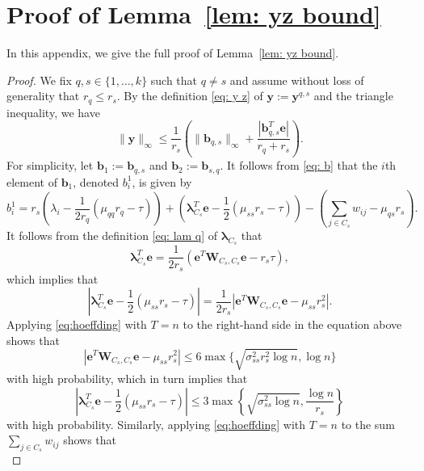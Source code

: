 \documentclass[twoside,11pt]{article}
\renewcommand{\b}{{\bs{b}}}
\newcommand{\e}{\bs {e}}
\newcommand{\bs}{\boldsymbol}
\newcommand{\W}{\bs {W}}
\newcommand{\0}{\bs{0}}
\newcommand{\bra}[1]{\ensuremath{\left\{ #1 \right\}}} %
\begin{document}
{\section{Proof of Lemma~\ref{lem: yz bound}}
\label{app: yz}
In this appendix, we give the full proof of Lemma~\ref{lem: yz bound}.
\begin{proof}
We fix $q,s \in \{1,\dots,k\}$ such that $q \neq s$ and assume without loss of generality that $r_q \leq r_s$.
By the definition \eqref{eq: y z} of $\bs{y} := \bs{y}^{q,s}$ and the triangle inequality, we have
\begin{equation}
\label{eq:y_inf}
	\|\bs{y}\|_{\infty} \leq \frac{1}{r_s}\left( \|\bs{b}_{q,s}\|_{\infty} + \frac{|\bs{b}_{q,s}^T \bs{e}|}{r_q +r_s}\right).
\end{equation}
For simplicity, let \(\b_1:= \b_{q,s}\) and \(\b_2 := \b_{s,q}\).
It follows from \eqref{eq: b} that the $i$th element of $\bs{b}_1$, denoted $b_i^1$, is given by
$$
	b_i^1 = r_s \left( \lambda_i -\frac{1}{2r_q}(\mu_{qq} r_q - \tau) \right) + \left(\bs{\lambda}_{C_s}^T\bs{e} - \frac{1}{2}(\mu_{ss} r_s - \tau) \right) - \left( \sum_{j \in C_s} w_{ij} - \mu_{qs} r_s \right).
$$
It follows from the definition \eqref{eq: lam q} of $\bs{\lambda}_{C_s}$  that
$$
	\bs{\lambda}_{C_s}^T\bs{e} = \frac{1}{2 r_s}\left(\bs{e}^T\bs{W}_{C_s,C_s}\bs{e} - r_s \tau \right),
$$
which implies that
$$
	\left| \bs{\lambda}_{C_s}^T\bs{e} - \frac{1}{2}(\mu_{ss} r_s - \tau)  \right| = \frac{1}{2r_s}\left|\bs{e}^T\bs{W}_{C_s,C_s}\bs{e}-\mu_{ss} r_s^2 \right|.
$$
Applying \eqref{eq:hoeffding} with $T = n$ to the right-hand side in the equation above shows that
\begin{equation} \label{cluster sum}
	|\e^T \W_{C_s, C_s} \e - \mu_{ss} r_s^2 |
	 \le 6 \max \{ \sqrt{\sigma_{ss}^2 r_s^2 \log n}, \log n \}
\end{equation}
with high probability,
which in turn implies that
\begin{equation} \label{lam sum}
	\left| \bs{\lambda}_{C_s}^T\bs{e} - \frac{1}{2}(\mu_{ss} r_s - \tau)
	\right| \le 3 \max\bra{ \sqrt{\sigma_{ss}^2  \log n}, \frac{\log n}{r_s} }
\end{equation}
with high probability.
Similarly, applying \eqref{eq:hoeffding} with $T=n$ to the sum $\sum_{j\in C_s} w_{ij}$ shows that
\begin{equation} \label{out sum}

\end{equation}
\end{proof}}
\end{document}

